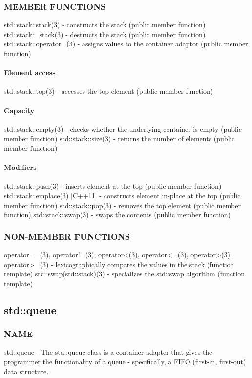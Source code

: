 \subsubsection{MEMBER FUNCTIONS}
std::stack::stack(3) - constructs the stack  (public member function)
std::stack::~stack(3) - destructs the stack  (public member function)
std::stack::operator=(3) - assigns values to the container adaptor  (public member function)
\paragraph{Element access}
std::stack::top(3) - accesses the top element   (public member function)
\paragraph{Capacity}
std::stack::empty(3) - checks whether the underlying container is empty   (public member function)
std::stack::size(3) - returns the number of elements   (public member function)
\paragraph{Modifiers}
std::stack::push(3) - inserts element at the top   (public member function)
std::stack::emplace(3) [C++11] - constructs element in-place at the top   (public member function)
std::stack::pop(3) - removes the top element   (public member function)
std::stack::swap(3) - swaps the contents   (public member function)

\subsubsection{NON-MEMBER FUNCTIONS}
operator==(3), operator!=(3), operator<(3), operator<=(3), operator>(3), operator>=(3) - lexicographically compares the values in the stack   (function template)
std::swap(std::stack)(3) - specializes the std::swap algorithm   (function template)


\subsection{std::queue}

\subsubsection{NAME}
std::queue - The std::queue class is a container adapter that gives the programmer the functionality of a queue - specifically, a FIFO (first-in, first-out) data structure.

